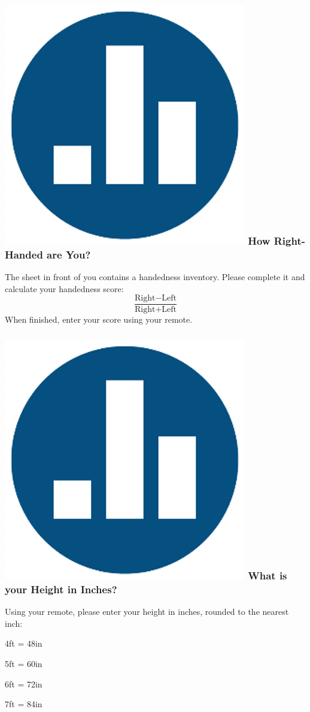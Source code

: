 \begin{frame}
\frametitle{\includegraphics[scale = 0.05]{./images/clicker} \hfill  How Right-Handed are You?}

The sheet in front of you contains a handedness inventory. Please complete it and calculate your handedness score:
	$$\frac{\mbox{Right} -\mbox{Left}}{\mbox{Right} + \mbox{Left}}$$
When finished, enter your score using your remote.
\end{frame}



\begin{frame}

\frametitle{\includegraphics[scale = 0.05]{./images/clicker} \hfill  What is your Height in Inches?}

Using your remote, please enter your height in inches, rounded to the nearest inch:

\vspace{1em}
	4ft = 48in
	
	5ft = 60in 
	
	6ft = 72in
	
	7ft = 84in


\end{frame}


